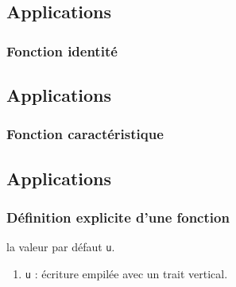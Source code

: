 \documentclass[12pt,a4paper]{book}
\theoremstyle{definition}
\begin{document}
{{\vspace{-.75em}
\begin{multicols}{2}
    
    
    
    
    
    
    
\end{multicols}


\subsection{Applications}

\subsubsection{Fonction identité}







\subsection{Applications}

\subsubsection{Fonction caractéristique}






\subsection{Applications}

\subsubsection{Définition explicite d'une fonction}





\IDoption{}  la valeur par défaut \verb+u+. 
\begin{enumerate}
	\item \verb+u+ : écriture empilée avec un trait vertical.
	

\end{enumerate}}}
\end{document}
